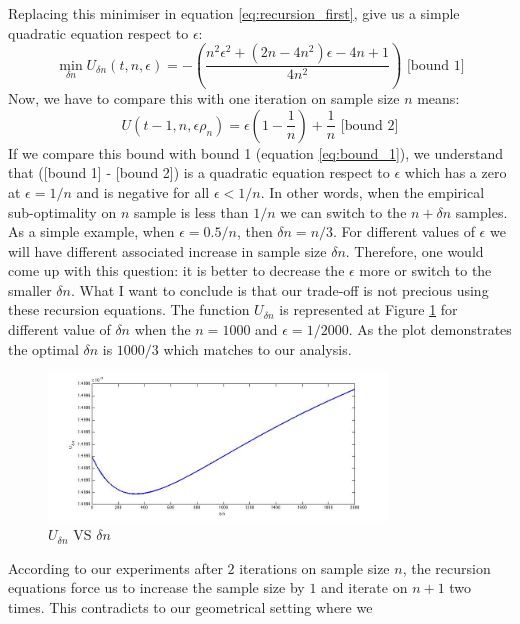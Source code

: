 \documentclass{article}
\begin{document}
 Replacing this minimiser in equation \ref{eq:recursion_first}, give
us a simple quadratic equation respect to $\epsilon$:
\begin{equation}
	 \min_{\delta n} U_{\delta n}(t,n,\epsilon) = 
	-(\frac{n^2\epsilon^2  +(2 n- 4 n^2) \epsilon  - 4 n + 1}{4 n^2})
	\text{   [bound 1]}\label{eq:bound_1}
\end{equation}
Now, we have to compare this with one iteration on sample size $n$ means: 
\begin{equation*}
	U \left(t-1,n, \epsilon \rho_n \right) = \epsilon(1-\frac{1}{n}) + \frac{1}{n}
	\text{   [bound 2]} \label{eq:bound_2}
\end{equation*}
If we compare this bound with bound 1 (equation \ref{eq:bound_1}), we understand
that ([bound 1] - [bound 2]) is a quadratic equation respect to $\epsilon$ which
has a zero at $\epsilon = 1/n$ and is negative for all $\epsilon <
1/n$.
In other words, when the empirical sub-optimality on
$n$ sample is less than $1/n$ we can switch to the $n + \delta n$ samples.
As a simple example, when $\epsilon = 0.5/n$, then $\delta n = n/3$. For
different values of $\epsilon$ we will have different associated increase in
sample size $\delta n$. Therefore, one would come up with this question: it
is better to decrease the $\epsilon$ more or switch to the smaller $\delta n$.
What I want to conclude is that our trade-off is not precious using these
recursion equations. The function $U_{\delta n}$ is represented at Figure
\ref{fig:delta_n_plot} for different value of $\delta n$ when the $n = 1000$ and $\epsilon = 1/2000$. As the plot demonstrates the optimal $\delta n$ is $1000/3$ which matches to our analysis.
\begin{figure}
\center
\includegraphics[width=0.8\textwidth]{optimal_delta.jpg} 
\caption{$U_{\delta n}$ VS $\delta n$}
\label{fig:delta_n_plot}
\end{figure}
According to our experiments after $2$ iterations on sample size $n$, the
recursion equations force us to increase the sample size by $1$ and iterate on
$n+1$ two times. This contradicts to our geometrical setting where we
\end{document}
